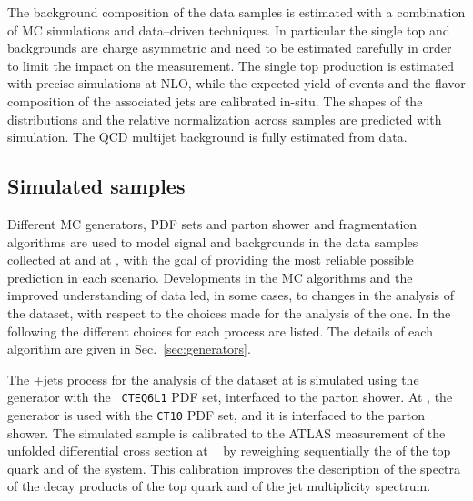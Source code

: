 The background composition of the data samples is estimated with a
combination of MC
simulations and data--driven techniques. In particular the single top 
and \wjets{} backgrounds are charge asymmetric and need to be estimated
carefully in order to limit the impact on the measurement. The single top
production is estimated with precise simulations at NLO, while the
expected yield of \wjets{} events and the flavor composition of the
associated jets are calibrated in-situ. The shapes of the
distributions and the relative normalization across samples are
predicted with simulation.
The QCD multijet background is fully estimated from data.

\subsection{Simulated samples}
\label{sec:mcsamples}

Different MC generators, PDF sets and parton shower and fragmentation
algorithms are used to model signal and backgrounds in the data
samples collected at \seventev{} and at \eighttev{}, with the goal of
providing the most reliable possible prediction in each scenario.
Developments in the MC algorithms and the improved understanding of
data led, in some cases, to changes in the analysis of the \eighttev{}
dataset, with respect to the choices made for the analysis of the
\seventev{} one. 
In the following the different choices for each process are
listed. The details of each algorithm are given in Sec.~\ref{sec:generators}.

The \ttbar{}+jets process for the analysis of the dataset at
\seventev{} is simulated using the \alpgen{} generator with the {\tt
  CTEQ6L1} PDF set, interfaced to the \herwig{} parton shower.  
At \eighttev{}, the \powheg{} generator is used with the {\tt CT10}
PDF set, and it is interfaced to the \pythia{} parton shower. 
The \powheg{} simulated sample is calibrated to the ATLAS measurement of the
unfolded differential cross section at \seventev{}~\cite{Aad:2014zka}
by reweighing sequentially the \pt{} of the top quark and of the
\ttbar{} system. This calibration improves the description of the
\pt{} spectra of the decay products of the top quark and of the jet
multiplicity spectrum.

